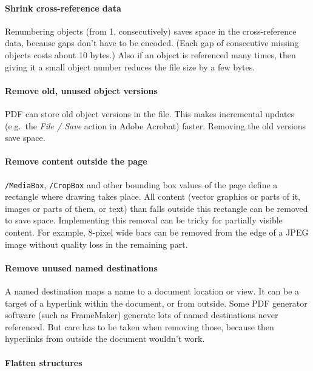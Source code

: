 \documentclass{ltugproc}
\begin{document}
\paragraph{Shrink cross-reference data}

Renumbering objects (from 1, consecutively) saves space in the
cross-reference data, because gaps don't have to be encoded. (Each gap of
consecutive missing objects costs about 10 bytes.) Also if an object is
referenced many times, then giving it a small object number reduces the file
size by a few bytes.

\paragraph{Remove old, unused object versions}

PDF can store old object versions in the file. This makes incremental
updates (e.g.\ the \emph{File / Save} action in Adobe Acrobat) faster.
Removing the old versions save space.

\paragraph{Remove content outside the page}

\texttt{/MediaBox}, \texttt{/CropBox} and other bounding box values of
the page define a rectangle where drawing takes place. All content
(vector graphics or parts of it, images or parts of them, or text) than
falls outside this rectangle can be removed to save space. Implementing this
removal can be tricky for partially visible content. For example, 8-pixel
wide bars can be removed from the edge of a JPEG image without quality loss
in the remaining part.

\paragraph{Remove unused named destinations}

A named destination maps a name to a document location or view. It can be a
target of a hyperlink within the document, or from outside. Some PDF
generator software (such as Frame\-Maker) generate lots of named destinations
never referenced. But care has to be taken when removing those, because then
hyperlinks from outside the document wouldn't work.

\paragraph{Flatten structures}
\end{document}
